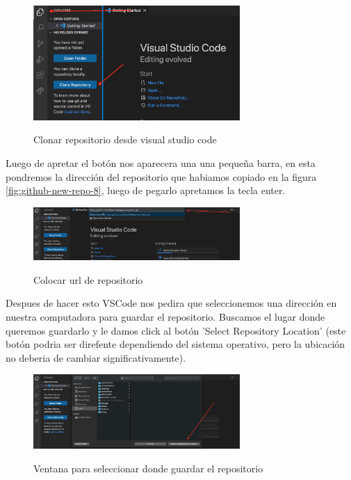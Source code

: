 \documentclass[11pt, oneside]{article}
\begin{document}
\begin{figure}[H]
  \centering
  \caption{Clonar repositorio desde visual studio code}
  \includegraphics[width=0.70\textwidth]{./img/github-new-repo-9.png}
  \label{fig:github-new-repo-9}
\end{figure}

Luego de apretar el botón nos aparecera una una pequeña barra, en esta pondremos la dirección del repositorio que habiamos copiado en la figura \ref{fig:github-new-repo-8}, luego de pegarlo apretamos la tecla enter.

\begin{figure}[H]
  \centering
  \caption{Colocar url de repositorio}
  \includegraphics[width=0.70\textwidth]{./img/github-new-repo-10.png}
  \label{fig:github-new-repo-10}
\end{figure}

Despues de hacer esto VSCode nos pedira que seleccionemos una dirección en nuestra computadora para guardar el repositorio. Buscamos el lugar donde queremos guardarlo y le damos click al botón 'Select Repository Location' (este botón podria ser direfente dependiendo del sistema operativo, pero la ubicación no deberia de cambiar significativamente).

\begin{figure}[H]
  \centering
  \caption{Ventana para seleccionar donde guardar el repositorio}
  \includegraphics[width=0.70\textwidth]{./img/github-new-repo-11.png}
  \label{fig:github-new-repo-11}
\end{figure}
\end{document}
